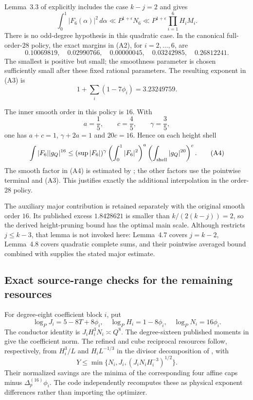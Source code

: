 \documentclass[11pt,letterpaper]{article}
\numberwithin{equation}{section}
\begin{document}
Lemma~3.3 of \cite{VW95} explicitly includes the case $k-j=2$ and gives
\[
 \int_0^1|F_6(\alpha)|^2\,d\alpha
       \ll P^{1+\epsilon}N_6
       \ll P^{1+\epsilon}\prod_{i=1}^6H_iM_i.             \tag{A3}
\]
There is no odd-degree hypothesis in this quadratic case. In the canonical
full-order-$28$ policy, the exact margins in (A2), for $i=2,\ldots,6$, are
\[
 0.10069819,\quad0.02990766,\quad0.00000045,
       \quad0.03242985,\quad0.26812241.
\]
The smallest is positive but small; the smoothness parameter is chosen
sufficiently small after these fixed rational parameters. The resulting
exponent in (A3) is
\[
 1+\sum_i(1-7\phi_i)=3.23249759.
\]

The inner smooth order in this policy is $16$. With
\[
 a=\frac15,\qquad c=\frac45,\qquad\gamma=\frac35,
\]
one has $a+c=1$, $\gamma+2a=1$ and $20c=16$. Hence on each height shell
\[
 \int |F_6||g_Q|^{16}
 \le(\sup|F_6|)^\gamma
        \left(\int_0^1|F_6|^2\right)^a
        \left(\int_{\rm shell}|g_Q|^{20}\right)^c.         \tag{A4}
\]
The smooth factor in (A4) is estimated by \cite[Theorem~4.2]{BW23}; the
other factors use the pointwise terminal and (A3). This justifies exactly
the additional interpolation in the order-$28$ policy.

The auxiliary major contribution is retained separately with the original
smooth order $16$. Its published excess $1.8428621$ is smaller than
$k/(2(k-j))=2$, so the derived height-pruning bound has the optimal main
scale. Although \cite[Lemma~4.10]{VW95} restricts $j\le k-3$, that lemma is
not invoked here: Lemma~4.7 covers $j=k-2$, Lemma~4.8 covers quadratic
complete sums, and their pointwise averaged bound combined with
\cite[Theorem~4.2]{BW23} supplies the stated major estimate.

\subsection{Exact source-range checks for the remaining resources}

For degree-eight coefficient block $i$, put
\[
 \log_PJ_i=5-8T+8\phi_i,\quad
 \log_PH_i=1-8\phi_i,\quad\log_PN_i=16\phi_i.
\]
The conductor identity is $J_iH_i^3N_i\asymp Q^8$. The degree-sixteen
published moments in \cite[Section~18]{VW00} give the coefficient norm.
The refined and cube reciprocal resources follow, respectively, from
$H_i^3/L$ and $H_iL^{-1/3}$ in the divisor decomposition of
\cite[Lemma~4.5]{VW95}, with
\[
 Y\le\min\{N_i,J_i,(J_iN_iH_i^{-3})^{1/2}\}.
\]
Their normalized savings are the minima of the corresponding four affine
caps minus $\Delta^{(16)}_p\phi_i$. The code independently recomputes
these as physical exponent differences rather than importing the optimizer.
\end{document}

